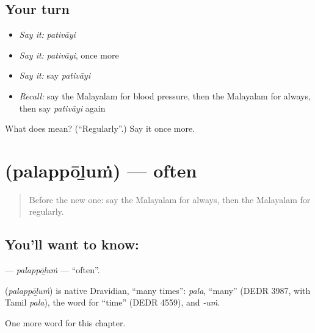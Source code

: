 \subsection*{Your turn}
\begin{itemize}
\raggedright
  \item \emph{Say it:} \emph{pativāyi}
  \item \emph{Say it:} \emph{pativāyi}, once more
  \item \emph{Say it:} say \emph{pativāyi}
  \item \emph{Recall:} say the Malayalam for blood pressure, then the Malayalam for always, then say \emph{pativāyi} again
\end{itemize}

\begin{tcolorbox}[breakable,colback=teal!4,colframe=teal!35!black,title={Before you move on}]
What does  mean? (\textquotedblleft{}Regularly\textquotedblright{}.) Say it once more.
\end{tcolorbox}
\section[\texorpdfstring{\ml{പലപ്പോഴും} (palappōḻuṁ)}{പലപ്പോഴും (palappōḻuṁ)}]{ (palappōḻuṁ) — often}

\label{lesson:ML-C276-palappolum}



\begin{quote}
Before the new one: say the Malayalam for always, then the Malayalam for regularly.
\end{quote}

\subsection*{You'll want to know: }
\textbf{} — \emph{palappōḻuṁ} — \textquotedblleft{}often\textquotedblright{}.

\begin{cousinweb}
\textbf{} (\emph{palappōḻuṁ}) is native Dravidian, \textquotedblleft{}many times\textquotedblright{}: \emph{pala}, \textquotedblleft{}many\textquotedblright{} (DEDR 3987, with Tamil \emph{pala}), the word for \textquotedblleft{}time\textquotedblright{} (DEDR 4559), and \emph{-uṁ}.
\end{cousinweb}

\begin{grammarlens}[title={What you've built}]
One more word for this chapter.
\end{grammarlens}

